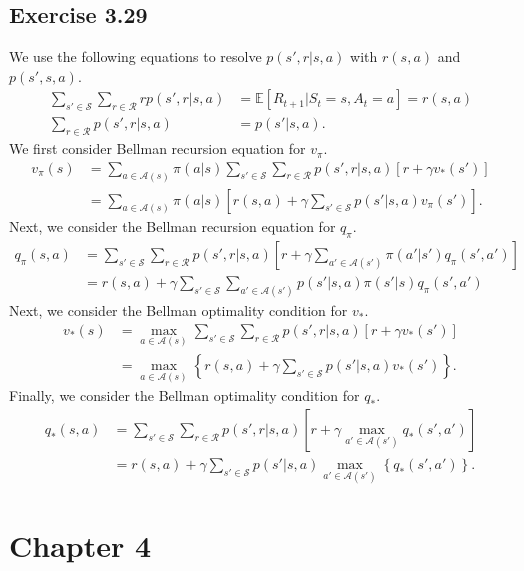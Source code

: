 \documentclass[10pt]{article}
\begin{document}
	 \subsection*{Exercise 3.29}
	 \label{ss:3.29}
	 We use the following equations to resolve $p(s',r|s,a)$ with $r(s,a)$ and $p(s',s,a)$.
	 \begin{align*}
	 \sum_{s'\in\mathcal{S}} \sum_{r\in\mathcal{R}} rp(s',r|s,a) &= \mathbb{E} \left[ R_{t+1}|S_t=s,A_t=a \right] = r(s,a)\\
	 \sum_{r\in\mathcal{R}} p(s',r|s,a) &= p(s'|s,a).
	 \end{align*}
	 We first consider Bellman recursion equation for $v_\pi$.
	 \begin{align*}
	 v_\pi(s) &= \sum_{a\in\mathcal{A}(s)} \pi(a|s) \sum_{s'\in\mathcal{S}} \sum_{r\in\mathcal{R}} p(s',r|s,a)\left[r+\gamma v_*(s') \right]\\
	 &= \sum_{a\in\mathcal{A}(s)}  \pi(a|s) \left[ r(s,a) + \gamma \sum_{s'\in\mathcal{S}} p(s'|s,a)v_\pi(s') \right].
	 \end{align*}
	 Next, we consider the Bellman recursion equation for $q_\pi$.
	 \begin{align*}
	 q_{\pi}(s,a) &= \sum_{s'\in\mathcal{S}} \sum_{r\in\mathcal{R}} p(s',r|s,a) \left[ r + \gamma \sum_{a'\in\mathcal{A}(s')} \pi(a'|s') q_\pi (s',a') \right]\\
	 &= r(s,a) + \gamma \sum_{s'\in\mathcal{S}} \sum_{a'\in\mathcal{A}(s')} p(s'|s,a) \pi(s'|s) q_\pi(s',a')
	 \end{align*}
	 Next, we consider the Bellman optimality condition for $v_*$.
	 \begin{align*}
	 v_*(s) &= \max\limits_{a\in\mathcal{A}(s)} \sum_{s'\in\mathcal{S}} \sum_{r\in\mathcal{R}} p(s',r|s,a) \left[ r + \gamma v_*(s') \right]\\
	 &= \max\limits_{a\in\mathcal{A}(s)} \left\{ r(s,a) + \gamma \sum_{s'\in\mathcal{S}} p(s'|s,a)v_*(s') \right\}.
	 \end{align*}
	 Finally, we consider the Bellman optimality condition for $q_*$.
	 \begin{align*}
	 q_*(s,a) &= \sum_{s'\in\mathcal{S}} \sum_{r\in\mathcal{R}} p(s',r|s,a) \left[ r + \gamma \max\limits_{a'\in\mathcal{A}(s')} q_*(s',a') \right]\\
	 &= r(s,a) + \gamma\sum_{s'\in\mathcal{S}} p(s'|s,a) \max\limits_{a'\in\mathcal{A}(s')}\left\{ q_*(s',a') \right\}.  
	 \end{align*}
	 \newpage
	 \section{Chapter 4}
	 \newcommand{\statesp}{\mathcal{S}^+}
	 \newcommand{\actionspa}{\mathcal{A}(s)}
	 \newcommand{\actionspb}{\mathcal{A}(s')}
	 \newcommand{\rewardsp}{\mathcal{R}}
\end{document}
